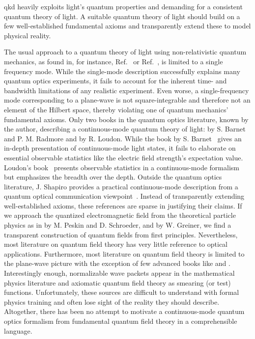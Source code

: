 \gls{qkd} heavily exploits light's quantum properties and demanding for a consistent quantum theory of light.
A suitable quantum theory of light should build on a few well-established fundamental axioms and transparently extend these to model physical reality.

The usual approach to a quantum theory of light using non-relativistic quantum mechanics, as found in, for instance, Ref.~\cite{Gerry2005} or Ref.~\cite{Fox2006}, is limited to a single frequency mode.
While the single-mode description successfully explains many quantum optics experiments, it fails to account for the inherent time- and bandwidth limitations of any realistic experiment.
Even worse, a single-frequency mode corresponding to a plane-wave is not square-integrable and therefore not an element of the Hilbert space, thereby violating one of quantum mechanics' fundamental axioms.
Only two books in the quantum optics literature, known by the author, describing a continuous-mode quantum theory of light:  by S. Barnet and P. M. Radmore and  by R. Loudon.
While the book by S. Barnet~\cite{Barnett2002} gives an in-depth presentation of continuous-mode light states, it fails to elaborate on essential observable statistics like the electric field strength's expectation value.
Loudon's book~\cite{Loudon2000} presents observable statistics in a continuous-mode formalism but emphasizes the breadth over the depth.
Outside the quantum optics literature, J. Shapiro provides a practical continuous-mode description from a quantum optical communication viewpoint~\cite{Shapiro2009}.
Instead of transparently extending well-established axioms, these references are sparse in justifying their claims.
If we approach the quantized electromagnetic field from the theoretical particle physics as in  by M. Peskin and D. Schroeder, and  by W. Greiner, we find a transparent construction of quantum fields from first principles.
Nevertheless, most literature on quantum field theory has very little reference to optical applications.
Furthermore, most literature on quantum field theory is limited to the plane-wave picture  with the exception of few advanced books like  and .
Interestingly enough, normalizable wave packets appear in the mathematical physics literature and axiomatic quantum field theory as smearing (or test) functions.
Unfortunately, these sources are difficult to understand with formal physics training and often lose sight of the reality they should describe.
Altogether, there has been no attempt to motivate a continuous-mode quantum optics formalism from fundamental quantum field theory in a comprehensible language.


